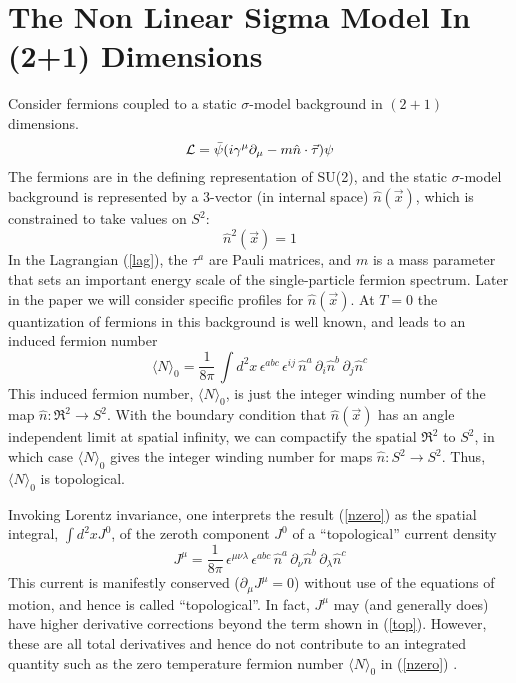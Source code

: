 \documentclass[a4paper,prd]{revtex4}
\begin{document}
\section{The Non Linear Sigma Model In (2+1) Dimensions}

Consider fermions coupled to a static $\sigma$-model background in $(2+1)$ dimensions.
\begin{equation}
{\cal L}=\bar{\psi}(i\gamma^{\mu}\partial_{\mu}-m\hat{n}\cdot \vec{\tau})\psi
\label{lag}
\end{equation}
The fermions are in the defining representation of SU(2), and the static
$\sigma$-model background is represented by a 3-vector (in internal
space) $\hat{n}(\vec{ x})$, which is constrained to take values on $ S^{2}$:
\begin{equation}
\hat{n}^{2}(\vec{x})=1
\label{constraint}
\end{equation}
In the Lagrangian (\ref{lag}), the $\tau^{a}$ are Pauli matrices,
and $m$ is a mass parameter that sets an important energy scale of the
single-particle fermion spectrum. Later in the paper we will consider
specific profiles for
$\hat{n}(\vec{x})$.  At
$T=0$ the quantization of fermions in this background is well known,
and leads to an induced fermion number
\cite{jaro1,carena,aw}
\begin{equation}
\langle N\rangle_0=\frac{1}{8\pi}\,  \int d^{2}x\,  \epsilon^{abc}\, 
\epsilon^{ij}\, \hat{n}^{a}\,\partial_i\hat{n}^{b}\, \partial_j\hat{n}^{c}
\label{nzero}
\end{equation}
This induced fermion number, $\langle N\rangle _0$, is just the integer
winding number of the map $\hat{n}: \Re^{2}\to S^2$. With the boundary
condition that $\hat{n}(\vec{x})$ has an angle independent limit at
spatial infinity, we can compactify the spatial $\Re^{2}$ to $S^{2}$,
in which case $\langle N\rangle _0$ gives the integer winding number
for maps $\hat{n}:S^{2}\to S^{2}$. Thus, $\langle N\rangle _0$ is
topological.

Invoking Lorentz invariance, one interprets the result (\ref{nzero}) as the spatial
integral, $\int d^{2}x J^{0}$, of the zeroth component $J^{0}$ of a ``topological''
current density
\begin{equation}
J^{\mu}=\frac{1}{8\pi}\,\epsilon^{\mu\nu\lambda}\, \epsilon^{abc}\, \hat{n}^{a}\,  
\partial_{\nu}\hat{n}^{b}\, \partial_{\lambda}\hat{n}^{c}
\label{top}
\end{equation}
This current is manifestly conserved ($\partial_{\mu}J^{\mu}=0$) without use of the
equations of motion, and hence is called ``topological''. In fact, $J^{\mu}$ may (and
generally does) have higher derivative corrections beyond the term shown in
(\ref{top}). However, these are all total derivatives and hence do not contribute to
an integrated quantity such as the zero temperature fermion number $\langle
N\rangle_0$ in (\ref{nzero}) \cite{wilczek}. 
\end{document}
